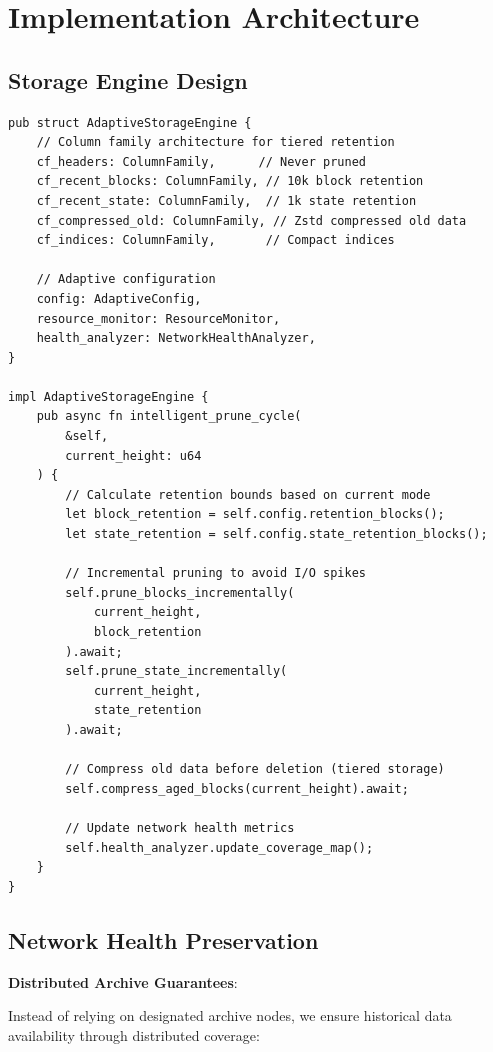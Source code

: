 \documentclass[11pt,a4paper]{article}
\begin{document}
\section{Implementation Architecture}

\subsection{Storage Engine Design}

\begin{lstlisting}
pub struct AdaptiveStorageEngine {
    // Column family architecture for tiered retention
    cf_headers: ColumnFamily,      // Never pruned
    cf_recent_blocks: ColumnFamily, // 10k block retention
    cf_recent_state: ColumnFamily,  // 1k state retention
    cf_compressed_old: ColumnFamily, // Zstd compressed old data
    cf_indices: ColumnFamily,       // Compact indices

    // Adaptive configuration
    config: AdaptiveConfig,
    resource_monitor: ResourceMonitor,
    health_analyzer: NetworkHealthAnalyzer,
}

impl AdaptiveStorageEngine {
    pub async fn intelligent_prune_cycle(
        &self,
        current_height: u64
    ) {
        // Calculate retention bounds based on current mode
        let block_retention = self.config.retention_blocks();
        let state_retention = self.config.state_retention_blocks();

        // Incremental pruning to avoid I/O spikes
        self.prune_blocks_incrementally(
            current_height,
            block_retention
        ).await;
        self.prune_state_incrementally(
            current_height,
            state_retention
        ).await;

        // Compress old data before deletion (tiered storage)
        self.compress_aged_blocks(current_height).await;

        // Update network health metrics
        self.health_analyzer.update_coverage_map();
    }
}
\end{lstlisting}

\subsection{Network Health Preservation}

\textbf{Distributed Archive Guarantees}:

Instead of relying on designated archive nodes, we ensure historical data availability through distributed coverage:
\end{document}
